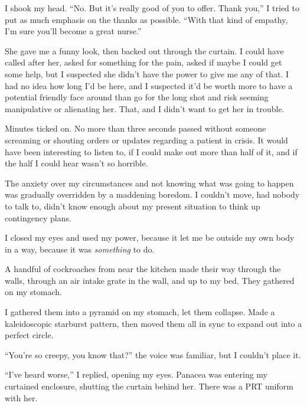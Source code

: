 I shook my head.  ``No.  But it's really good of you to offer.  Thank you,'' I tried to put as much emphasis on the thanks as possible.  ``With that kind of empathy, I'm sure you'll become a great nurse.''



She gave me a funny look, then backed out through the curtain.  I could have called after her, asked for something for the pain, asked if maybe I could get some help, but I suspected she didn't have the power to give me any of that.  I had no idea how long I'd be here, and I suspected it'd be worth more to have a potential friendly face around than go for the long shot and risk seeming manipulative or alienating her.  That, and I didn't want to get her in trouble.



Minutes ticked on.  No more than three seconds passed without someone screaming or shouting orders or updates regarding a patient in crisis.  It would have been interesting to listen to, if I could make out more than half of it, and if the half I could hear wasn't so horrible.



The anxiety over my circumstances and not knowing what was going to happen was gradually overridden by a maddening boredom.   I couldn't move, had nobody to talk to, didn't know enough about my present situation to think up contingency plans.



I closed my eyes and used my power, because it let me be outside my own body in a way, because it was \emph{something} to do.



A handful of cockroaches from near the kitchen made their way through the walls, through an air intake grate in the wall, and up to my bed.  They gathered on my stomach.



I gathered them into a pyramid on my stomach, let them collapse.  Made a kaleidoscopic starburst pattern, then moved them all in sync to expand out into a perfect circle.



``You're so creepy, you know that?'' the voice was familiar, but I couldn't place it.



``I've heard worse,'' I replied, opening my eyes.  Panacea was entering my curtained enclosure, shutting the curtain behind her.  There was a PRT uniform with her.




